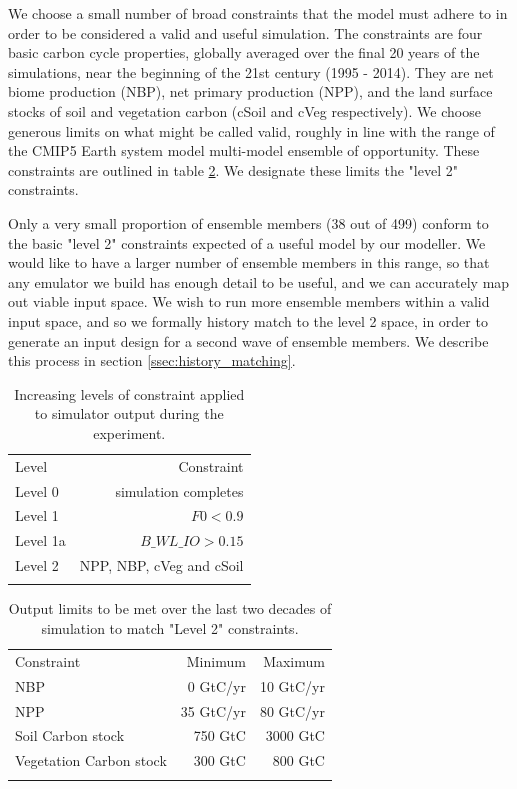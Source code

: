 \documentclass[gmd, manuscript]{copernicus}
\begin{document}
We choose a small number of broad constraints that the model must adhere to in order to be considered a valid and useful simulation. The constraints are four basic carbon cycle properties, globally averaged over the final 20 years of the simulations, near the beginning of the 21st century (1995 - 2014). They are net biome production (NBP), net primary production (NPP), and the land surface stocks of soil and vegetation carbon (cSoil and cVeg respectively). We choose generous limits on what might be called valid, roughly in line with the range of the CMIP5 Earth system model multi-model ensemble of opportunity. These constraints are outlined in table \ref{table:level_2_constraints}. We designate these limits the "level 2" constraints.

Only a very small proportion of ensemble members (38 out of 499) conform to the basic "level 2" constraints expected of a useful model by our modeller. We would like to have a larger number of ensemble members in this range, so that any emulator we build has enough detail to be useful, and we can accurately map out viable input space. We wish to run more ensemble members within a valid input space, and so we formally history match to the level 2 space, in order to generate an input design for a second wave of ensemble members. We describe this process in section \ref{ssec:history_matching}.

\begin{table}[t]
\caption{Increasing levels of constraint applied to simulator output during the experiment.}
\label{table:levels_of_constraint}
\begin{tabular}{l r}
\tophline
Level & Constraint  \\ 
\middlehline
Level 0  & simulation completes \\
Level 1 & $F0 < 0.9$ \\
Level 1a & $B\_WL\_IO > 0.15 $ \\ 
Level 2  & NPP, NBP, cVeg and cSoil \\

\bottomhline
\end{tabular}
\belowtable{} %

\end{table}


\begin{table}[t]
\caption{Output limits to be met over the last two decades of simulation to match "Level 2" constraints.}
\label{table:level_2_constraints}
\begin{tabular}{l r r}
\tophline
Constraint & Minimum & Maximum \\ 
\middlehline
NBP & 0 GtC/yr &  10 GtC/yr\\
NPP & 35 GtC/yr & 80 GtC/yr \\
Soil Carbon stock & 750 GtC &  3000 GtC\\ 
Vegetation Carbon stock & 300 GtC & 800 GtC \\

\bottomhline
\end{tabular}
\belowtable{} %

\end{table}
\end{document}
